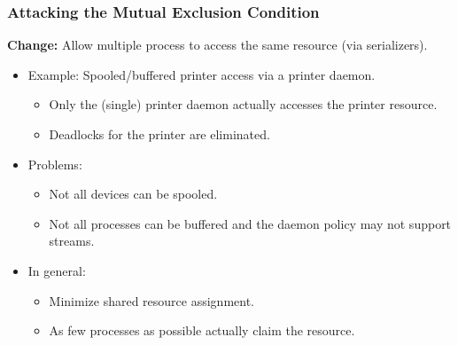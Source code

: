             \subsubsection{Attacking the Mutual Exclusion Condition}
                \textbf{Change:} Allow multiple process to access the same resource (via serializers).
                \begin{itemize}
                	\item Example: Spooled/buffered printer access via a printer daemon.
                    	\begin{itemize}
                    		\item Only the (single) printer daemon actually accesses the printer resource.
                    		\item Deadlocks for the printer are eliminated.
                    	\end{itemize}
                	\item Problems:
                    	\begin{itemize}
	                    	\item Not all devices can be spooled.
	                    	\item Not all processes can be buffered and the daemon policy may not support streams.
						\end{itemize}
					\item In general:
						\begin{itemize}
							\item Minimize shared resource assignment.
							\item As few processes as possible actually claim the resource.
						\end{itemize}
                \end{itemize}


